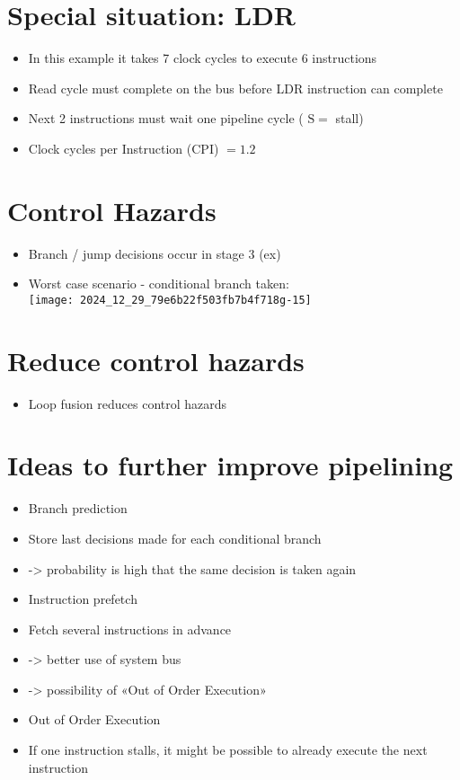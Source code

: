     \section*{Special situation: LDR}
    \begin{itemize}
      \item In this example it takes 7 clock cycles to execute 6 instructions
      \item Read cycle must complete on the bus before LDR instruction can complete
      \item Next 2 instructions must wait one pipeline cycle ( $\mathrm{S}=$ stall)
      \item Clock cycles per Instruction (CPI) $=1.2$
    \end{itemize}
    
    \section*{Control Hazards}
    \begin{itemize}
      \item Branch / jump decisions occur in stage 3 (ex)
      \item Worst case scenario - conditional branch taken:\\
    \texttt{[image: 2024\_12\_29\_79e6b22f503fb7b4f718g-15]}
    \end{itemize}
    
    \section*{Reduce control hazards}
    \begin{itemize}
      \item Loop fusion reduces control hazards
    \end{itemize}
    
    \section*{Ideas to further improve pipelining}
    \begin{itemize}
      \item Branch prediction
      \item Store last decisions made for each conditional branch
      \item -> probability is high that the same decision is taken again
      \item Instruction prefetch
      \item Fetch several instructions in advance
      \item -> better use of system bus
      \item -> possibility of «Out of Order Execution»
      \item Out of Order Execution
      \item If one instruction stalls, it might be possible to already execute the next instruction
    \end{itemize}
    
